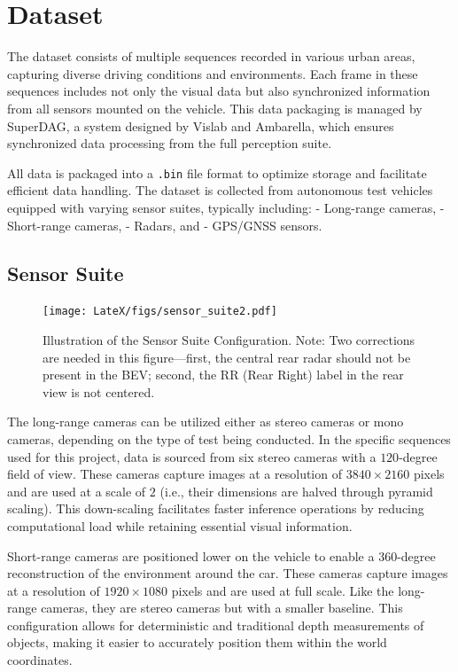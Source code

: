 \section{Dataset}
The dataset consists of multiple sequences recorded in various urban areas, capturing diverse driving conditions and environments. Each frame in these sequences includes not only the visual data but also synchronized information from all sensors mounted on the vehicle. This data packaging is managed by SuperDAG, a system designed by Vislab and Ambarella, which ensures synchronized data processing from the full perception suite.

All data is packaged into a \texttt{.bin} file format to optimize storage and facilitate efficient data handling. The dataset is collected from autonomous test vehicles equipped with varying sensor suites, typically including:
- Long-range cameras,
- Short-range cameras,
- Radars, and
- GPS/GNSS sensors.
\subsection{Sensor Suite}

\begin{figure}
    \centering
    \texttt{[image: LateX/figs/sensor\_suite2.pdf]}
    \caption{Illustration of the Sensor Suite Configuration. Note: Two corrections are needed in this figure—first, the central rear radar should not be present in the BEV; second, the RR (Rear Right) label in the rear view is not centered.}
    \label{fig:sensor-suite}
\end{figure}

The long-range cameras can be utilized either as stereo cameras or mono cameras, depending on the type of test being conducted. In the specific sequences used for this project, data is sourced from six stereo cameras with a $120$-degree field of view. These cameras capture images at a resolution of $3840 \times 2160$ pixels and are used at a scale of $2$ (i.e., their dimensions are halved through pyramid scaling). This down-scaling facilitates faster inference operations by reducing computational load while retaining essential visual information.

Short-range cameras are positioned lower on the vehicle to enable a 360-degree reconstruction of the environment around the car. These cameras capture images at a resolution of $1920 \times 1080$ pixels and are used at full scale. Like the long-range cameras, they are stereo cameras but with a smaller baseline. This configuration allows for deterministic and traditional depth measurements of objects, making it easier to accurately position them within the world coordinates.

